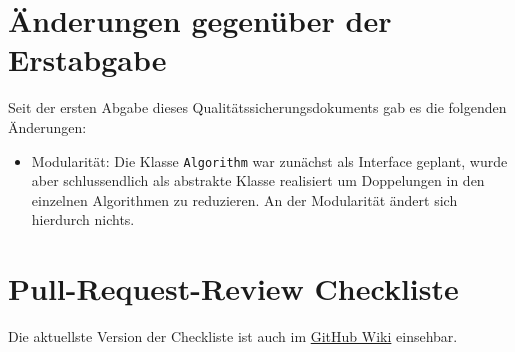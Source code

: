 \documentclass[accentcolor=tud0b,12pt,paper=a4]{tudreport}
\begin{document}
\section{Änderungen gegenüber der Erstabgabe}
Seit der ersten Abgabe dieses Qualitätssicherungsdokuments gab es die folgenden Änderungen:
\begin{itemize}
\item Modularität: Die Klasse \texttt{Algorithm} war zunächst als Interface geplant, wurde aber schlussendlich als abstrakte Klasse realisiert um Doppelungen in den einzelnen Algorithmen zu reduzieren. An der Modularität ändert sich hierdurch nichts.
\end{itemize}
			
\section{Pull-Request-Review Checkliste}
Die aktuellste Version der Checkliste ist auch im \href{https://github.com/TUDa-BP-11/opendiabetes-uam-heuristik/wiki/Checklist-Pull-Request-Review}{GitHub Wiki} einsehbar.
\end{document}
